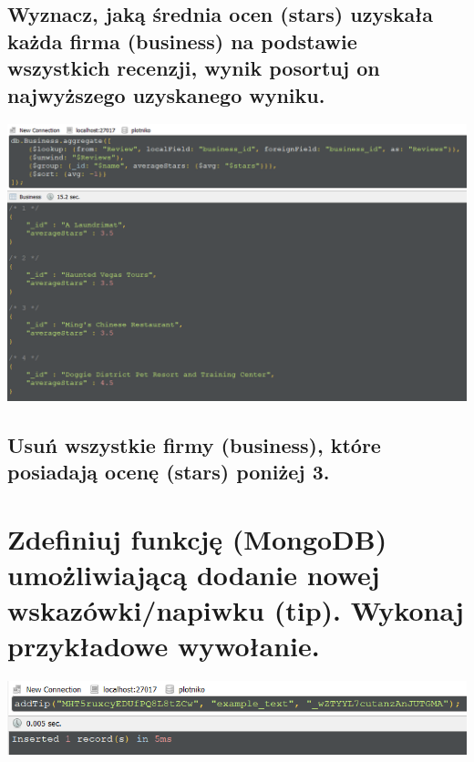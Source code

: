 \documentclass[a4paper, 11pt]{article}
\begin{document}
    \newpage

    \subsection{Wyznacz, jaką średnia ocen (stars) uzyskała każda firma (business) na podstawie
    wszystkich recenzji, wynik posortuj on najwyższego uzyskanego wyniku. }

    

    \begin{center}
        \includegraphics[scale=0.8]{images/task1/1f.png}
    \end{center}

    \newpage

    \subsection{Usuń wszystkie firmy (business), które posiadają ocenę (stars) poniżej 3. }

    


    \newpage

    \section{Zdefiniuj funkcję (MongoDB) umożliwiającą dodanie nowej wskazówki/napiwku (tip).
    Wykonaj przykładowe wywołanie. }

    

    \begin{center}
        \includegraphics[scale=0.8]{images/task2/Execution.png}
    \end{center}
\end{document}
